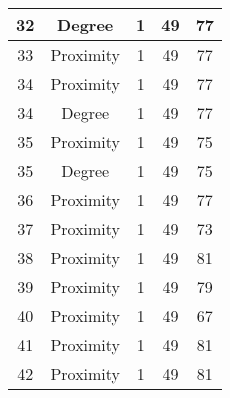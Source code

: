 \documentclass[results.tex]{subfiles}
\begin{document}
\begin{center}
\begin{tabular}{| c || c | c | c | c |}
            \hline
            32                      & Degree                       & 1                      & 49                      & 77                   \\
            \hline
            33                      & Proximity                    & 1                      & 49                      & 77                   \\
            \hline
            34                      & Proximity                    & 1                      & 49                      & 77                   \\
            \hline
            34                      & Degree                       & 1                      & 49                      & 77                   \\
            \hline
            35                      & Proximity                    & 1                      & 49                      & 75                   \\
            \hline
            35                      & Degree                       & 1                      & 49                      & 75                   \\
            \hline
            36                      & Proximity                    & 1                      & 49                      & 77                   \\
            \hline
            37                      & Proximity                    & 1                      & 49                      & 73                   \\
            \hline
            38                      & Proximity                    & 1                      & 49                      & 81                   \\
            \hline
            39                      & Proximity                    & 1                      & 49                      & 79                   \\
            \hline
            40                      & Proximity                    & 1                      & 49                      & 67                   \\
            \hline
            41                      & Proximity                    & 1                      & 49                      & 81                   \\
            \hline
            42                      & Proximity                    & 1                      & 49                      & 81                   \\

\end{tabular}
\end{center}
\end{document}

